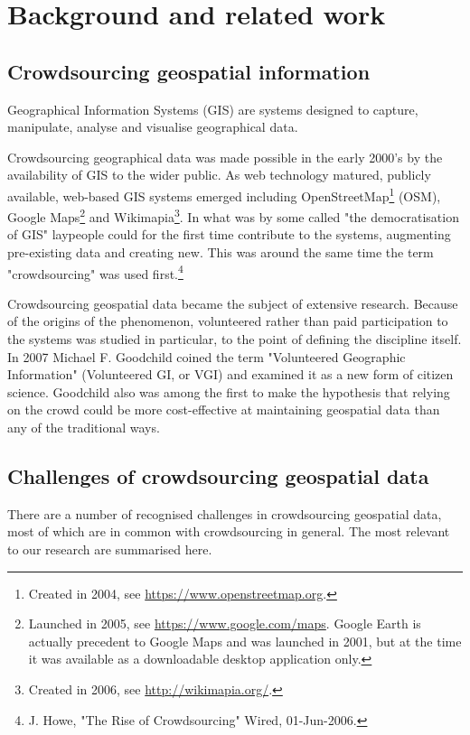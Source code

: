 \section{Background and related work}

\subsection{Crowdsourcing geospatial information}

Geographical Information Systems (GIS) are systems designed to capture, manipulate, analyse and visualise geographical data. 

Crowdsourcing geographical data was made possible in the early 2000's by the availability of GIS to the wider public. As web technology matured, publicly available, web-based GIS systems emerged including OpenStreetMap\footnote{Created in 2004, see \url{https://www.openstreetmap.org}.} (OSM), Google Maps\footnote{Launched in 2005, see \url{https://www.google.com/maps}. Google Earth is actually precedent to Google Maps and was launched in 2001, but at the time it was available as a downloadable desktop application only.} and Wikimapia\footnote{Created in 2006, see \url{http://wikimapia.org/}.}. In what was by some called "the democratisation of GIS" \cite{Butler:2006fe} laypeople could for the first time contribute to the systems, augmenting pre-existing data and creating new. This was around the same time the term "crowdsourcing" was used first.\footnote{J. Howe, "The Rise of Crowdsourcing" Wired, 01-Jun-2006.}

Crowdsourcing geospatial data became the subject of extensive research. Because of the origins of the phenomenon, volunteered rather than paid participation to the systems was studied in particular, to the point of defining the discipline itself. In 2007 Michael F. Goodchild coined the term "Volunteered Geographic Information" (Volunteered GI, or VGI) \cite{Goodchild:2007vt} and examined it as a new form of citizen science. Goodchild also was among the first to make the hypothesis that relying on the crowd could be more cost-effective at maintaining geospatial data than any of the traditional ways.

\subsection{Challenges of crowdsourcing geospatial data}
\label{challenges-of-crowdsourcing-geospatial-data}

There are a number of recognised challenges in crowdsourcing geospatial data, most of which are in common with crowdsourcing in general. The most relevant to our research are summarised here.

